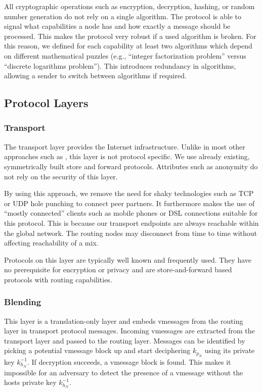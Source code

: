 \documentclass[runningheads]{llncs}
\begin{document}
All cryptographic operations such as encryption, decryption, hashing, or random number generation do not rely on a single algorithm. The protocol is able to signal what capabilities a node has and how exactly a message should be processed. This makes the protocol very robust if a used algorithm is broken. For this reason, we defined for each capability at least two algorithms which depend on different mathematical puzzles (e.g., ``integer factorization problem'' versus ``discrete logarithms problem''). This introduces redundancy in algorithms, allowing a sender to switch between algorithms if required.

\subsection{Protocol Layers}
\subsubsection{Transport}
The transport layer provides the Internet infrastructure. Unlike in most other approaches such as \cite{tor-design,sherwood2005p5,freenet}, this layer is not protocol specific. We use already existing, symmetrically built store and forward protocols. Attributes such as anonymity do not rely on the security of this layer.

By using this approach, we remove the need for shaky technologies such as TCP or UDP hole punching to connect peer partners. It furthermore makes the use of ``mostly connected'' clients such as mobile phones or DSL connections suitable for this protocol. This is because our transport endpoints are always reachable within the global network. The routing nodes may disconnect from time to time without affecting reachability of a mix. 

Protocols on this layer are typically well known and frequently used. They have no prerequisite for encryption or privacy and are store-and-forward based protocols with routing capabilities. 

\subsubsection{Blending}
This layer is a translation-only layer and embeds vmessages from the routing layer in transport protocol messages. Incoming vmessages are extracted from the transport layer and passed to the routing layer. Messages can be identified by picking a potential vmessage block up and start deciphering $k_{p_N}$ using its private key $k^{-1}_{h_N}$. If decryption succeeds, a vmessage block is found. This makes it impossible for an adversary to detect the presence of a vmessage without the hosts private key $k^{-1}_{h_N}$.
\end{document}
